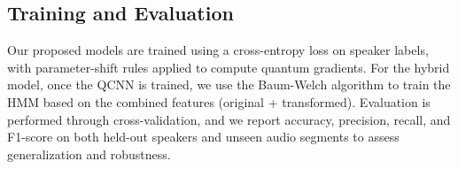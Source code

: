 \documentclass[conference]{IEEEtran}
\begin{document}
\subsection{Training and Evaluation}

Our proposed models are trained using a cross-entropy loss on speaker labels, with parameter-shift rules applied to compute quantum gradients. For the hybrid model, once the QCNN is trained, we use the Baum-Welch algorithm to train the HMM based on the combined features (original + transformed). Evaluation is performed through cross-validation, and we report accuracy, precision, recall, and F1-score on both held-out speakers and unseen audio segments to assess generalization and robustness.



\end{document}
